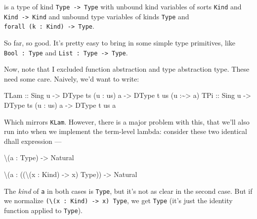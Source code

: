 \documentclass[]{article}
\newenvironment{Shaded}{}{}
\newcommand{\DataTypeTok}[1]{\textcolor[rgb]{0.56,0.13,0.00}{#1}}
\newcommand{\NormalTok}[1]{#1}
\newcommand{\OperatorTok}[1]{\textcolor[rgb]{0.40,0.40,0.40}{#1}}
\newcommand{\OtherTok}[1]{\textcolor[rgb]{0.00,0.44,0.13}{#1}}
\begin{document}
is a type of kind \texttt{Type\ -\textgreater{}\ Type} with unbound kind
variables of sorts \texttt{Kind} and \texttt{Kind\ -\textgreater{}\ Kind} and
unbound type variables of kinds \texttt{Type} and
\texttt{forall\ (k\ :\ Kind)\ -\textgreater{}\ Type}.

So far, so good. It's pretty easy to bring in some simple type primitives, like
\texttt{Bool\ :\ Type} and \texttt{List\ :\ Type\ -\textgreater{}\ Type}.

Now, note that I excluded function abstraction and type abstraction type. These
need some care. Naively, we'd want to write:

\begin{Shaded}
\begin{Highlighting}[]
\DataTypeTok{TLam}\OtherTok{ ::} \DataTypeTok{Sing}\NormalTok{ u }\OtherTok{{-}>} \DataTypeTok{DType}\NormalTok{ ts (u \textquotesingle{}}\OperatorTok{:}\NormalTok{ us) a }\OtherTok{{-}>} \DataTypeTok{DType}\NormalTok{ t us (u \textquotesingle{}}\OperatorTok{:\textasciitilde{}>}\NormalTok{ a)}
\DataTypeTok{TPi}\OtherTok{  ::} \DataTypeTok{Sing}\NormalTok{ u }\OtherTok{{-}>} \DataTypeTok{DType}\NormalTok{ ts (u \textquotesingle{}}\OperatorTok{:}\NormalTok{ us) a }\OtherTok{{-}>} \DataTypeTok{DType}\NormalTok{ t us a}
\end{Highlighting}
\end{Shaded}

Which mirrors \texttt{KLam}. However, there is a major problem with this, that
we'll also run into when we implement the term-level lambda: consider these two
identical dhall expression ---

\begin{Shaded}
\begin{Highlighting}[]
\NormalTok{\textbackslash{}(a }\OperatorTok{:} \DataTypeTok{Type}\NormalTok{) }\OtherTok{{-}>} \DataTypeTok{Natural}

\NormalTok{\textbackslash{}(a }\OperatorTok{:}\NormalTok{ ((\textbackslash{}(x }\OperatorTok{:} \DataTypeTok{Kind}\NormalTok{) }\OtherTok{{-}>}\NormalTok{ x) }\DataTypeTok{Type}\NormalTok{)) }\OtherTok{{-}>} \DataTypeTok{Natural}
\end{Highlighting}
\end{Shaded}

The \emph{kind} of \texttt{a} in both cases is \texttt{Type}, but it's not as
clear in the second case. But if we normalize
\texttt{(\textbackslash{}(x\ :\ Kind)\ -\textgreater{}\ x)\ Type}, we get
\texttt{Type} (it's just the identity function applied to \texttt{Type}).
\end{document}
